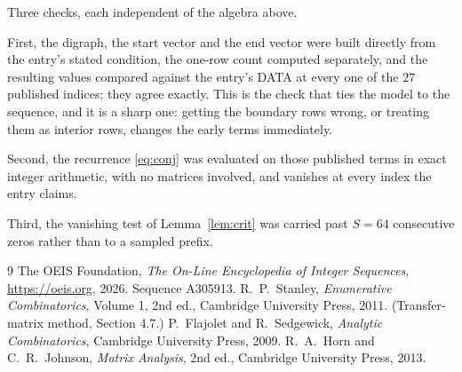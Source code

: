 \documentclass[11pt,a4paper]{article}
\theoremstyle{plain}
\theoremstyle{definition}
\begin{document}
Three checks, each independent of the algebra above.

First, the digraph, the start vector and the end vector were built directly from the
entry's stated condition, the one-row count computed separately, and the resulting values
compared against the entry's DATA at every one of the $27$ published indices; they
agree exactly. This is the check that ties the model to the sequence, and it is a sharp one:
getting the boundary rows wrong, or treating them as interior rows, changes the early terms
immediately.

Second, the recurrence \eqref{eq:conj} was evaluated on those published terms in exact
integer arithmetic, with no matrices involved, and vanishes at every index the entry claims.

Third, the vanishing test of Lemma~\ref{lem:crit} was carried past $S=64$ consecutive
zeros rather than to a sampled prefix.

\begin{thebibliography}{9}
 The OEIS Foundation, \emph{The On-Line Encyclopedia of Integer
Sequences}, \url{https://oeis.org}, 2026. Sequence A305913.
 R.~P.~Stanley, \emph{Enumerative Combinatorics}, Volume 1, 2nd ed.,
Cambridge University Press, 2011. (Transfer-matrix method, Section 4.7.)
 P.~Flajolet and R.~Sedgewick, \emph{Analytic Combinatorics}, Cambridge
University Press, 2009.
 R.~A.~Horn and C.~R.~Johnson, \emph{Matrix Analysis}, 2nd ed., Cambridge
University Press, 2013.
\end{thebibliography}
\end{document}
